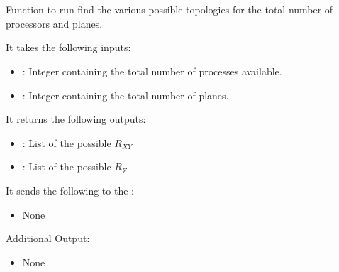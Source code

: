 
\section{}

Function to run find the various possible topologies for the total number of processors and planes.

It takes the following inputs:

\begin{itemize}
\item {}: Integer containing the total number of processes available.
\item {}: Integer containing the total number of planes.
\end{itemize}

It returns the following outputs:

\begin{itemize}
\item {}: List of the possible \(R_{XY}\)
\item {}: List of the possible \(R_Z\)
\end{itemize}

It sends the following to the :

\begin{itemize}
\item None
\end{itemize}

Additional Output:
\begin{itemize}
\item None
\end{itemize}

